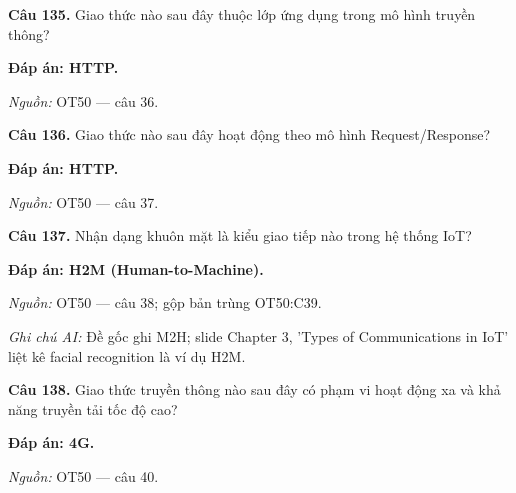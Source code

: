 \documentclass[11pt,a4paper]{article}
\begin{document}
\textbf{Câu 135.} Giao thức nào sau đây thuộc lớp ứng dụng trong mô hình truyền thông?\par
{\color{answer}\textbf{Đáp án: HTTP.}}\par
{\footnotesize\color{sourcegray}\textit{Nguồn:} OT50 — câu 36.\par}
\vspace{3pt}\par\noindent{\color{black!18}\rule{\linewidth}{0.3pt}}\par\medskip

\textbf{Câu 136.} Giao thức nào sau đây hoạt động theo mô hình Request/Response?\par
{\color{answer}\textbf{Đáp án: HTTP.}}\par
{\footnotesize\color{sourcegray}\textit{Nguồn:} OT50 — câu 37.\par}
\vspace{3pt}\par\noindent{\color{black!18}\rule{\linewidth}{0.3pt}}\par\medskip

\textbf{Câu 137.} Nhận dạng khuôn mặt là kiểu giao tiếp nào trong hệ thống IoT?\par
{\color{answer}\textbf{Đáp án: H2M (Human-to-Machine).}}\par
{\footnotesize\color{sourcegray}\textit{Nguồn:} OT50 — câu 38; gộp bản trùng OT50:C39.\par}
{\footnotesize\color{sourcegray}\textit{Ghi chú AI:} Đề gốc ghi M2H; slide Chapter 3, 'Types of Communications in IoT' liệt kê facial recognition là ví dụ H2M.\par}
\vspace{3pt}\par\noindent{\color{black!18}\rule{\linewidth}{0.3pt}}\par\medskip

\textbf{Câu 138.} Giao thức truyền thông nào sau đây có phạm vi hoạt động xa và khả năng truyền tải tốc độ cao?\par
{\color{answer}\textbf{Đáp án: 4G.}}\par
{\footnotesize\color{sourcegray}\textit{Nguồn:} OT50 — câu 40.\par}
\vspace{3pt}\par\noindent{\color{black!18}\rule{\linewidth}{0.3pt}}\par\medskip
\end{document}
